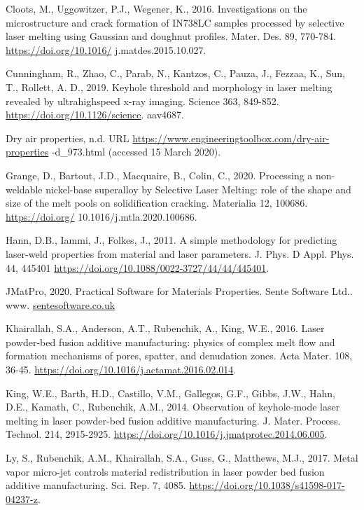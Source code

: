 \documentclass[10pt]{article}
\begin{document}
Cloots, M., Uggowitzer, P.J., Wegener, K., 2016. Investigations on the microstructure and crack formation of IN738LC samples processed by selective laser melting using Gaussian and doughnut profiles. Mater. Des. 89, 770-784. \href{https://doi.org/10.1016/}{https://doi.org/10.1016/} j.matdes.2015.10.027.

Cunningham, R., Zhao, C., Parab, N., Kantzos, C., Pauza, J., Fezzaa, K., Sun, T., Rollett, A. D., 2019. Keyhole threshold and morphology in laser melting revealed by ultrahighspeed x-ray imaging. Science 363, 849-852. \href{https://doi.org/10.1126/science}{https://doi.org/10.1126/science}. aav4687.

Dry air properties, n.d. URL \href{https://www.engineeringtoolbox.com/dry-air-properties}{https://www.engineeringtoolbox.com/dry-air-properties} -d\_973.html (accessed 15 March 2020).

Grange, D., Bartout, J.D., Macquaire, B., Colin, C., 2020. Processing a non-weldable nickel-base superalloy by Selective Laser Melting: role of the shape and size of the melt pools on solidification cracking. Materialia 12, 100686. \href{https://doi.org/}{https://doi.org/} 10.1016/j.mtla.2020.100686.

Hann, D.B., Iammi, J., Folkes, J., 2011. A simple methodology for predicting laser-weld properties from material and laser parameters. J. Phys. D Appl. Phys. 44, 445401 \href{https://doi.org/10.1088/0022-3727/44/44/445401}{https://doi.org/10.1088/0022-3727/44/44/445401}.

JMatPro, 2020. Practical Software for Materials Properties. Sente Software Ltd.. www. \href{http://sentesoftware.co.uk}{sentesoftware.co.uk}

Khairallah, S.A., Anderson, A.T., Rubenchik, A., King, W.E., 2016. Laser powder-bed fusion additive manufacturing: physics of complex melt flow and formation mechanisms of pores, spatter, and denudation zones. Acta Mater. 108, 36-45. \href{https://doi.org/10.1016/j.actamat.2016.02.014}{https://doi.org/10.1016/j.actamat.2016.02.014}.

King, W.E., Barth, H.D., Castillo, V.M., Gallegos, G.F., Gibbs, J.W., Hahn, D.E., Kamath, C., Rubenchik, A.M., 2014. Observation of keyhole-mode laser melting in laser powder-bed fusion additive manufacturing. J. Mater. Process. Technol. 214, 2915-2925. \href{https://doi.org/10.1016/j.jmatprotec.2014.06.005}{https://doi.org/10.1016/j.jmatprotec.2014.06.005}.

Ly, S., Rubenchik, A.M., Khairallah, S.A., Guss, G., Matthews, M.J., 2017. Metal vapor micro-jet controls material redistribution in laser powder bed fusion additive manufacturing. Sci. Rep. 7, 4085. \href{https://doi.org/10.1038/s41598-017-04237-z}{https://doi.org/10.1038/s41598-017-04237-z}.
\end{document}
